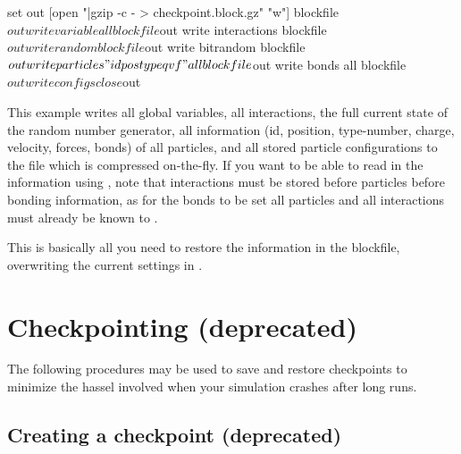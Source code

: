 \begin{tclcode}
set out [open "|gzip -c - > checkpoint.block.gz" "w"]
blockfile $out write variable all
blockfile $out write interactions
blockfile $out write random
blockfile $out write bitrandom
blockfile $out write particles "id pos type q v f" all
blockfile $out write bonds all
blockfile $out write configs
close $out 
\end{tclcode}

This example writes all global variables, all interactions, the full
current state of the random number generator, all information (\ie id,
position, type-number, charge, velocity, forces, bonds) of all
particles, and all stored particle configurations to the file
 which is compressed on-the-fly.  If you want
to be able to read in the information using \es, note that
interactions must be stored before particles before bonding
information, as for the bonds to be set all particles and all
interactions must already be known to \es.

This is basically all you need to restore the information in the
blockfile, overwriting the current settings in \es.

\section{Checkpointing (deprecated)}


The following procedures may be used to save and restore checkpoints
to minimize the hassel involved when your simulation crashes after
long runs.

\subsection{Creating a checkpoint (deprecated)}

